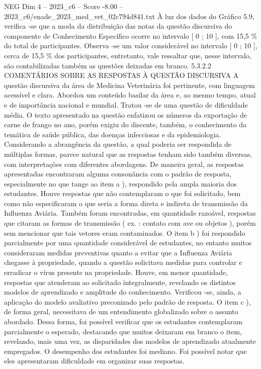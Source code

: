 \begin{textsample}{NEG Dim 4 – 2023\_c6 – Score -8.00 – 2023\_c6/enade\_2023\_med\_vet\_02c794d841.txt}
À luz dos dados do Gráfico 5.9, verifica -se que a moda da distribuição das notas da questão discursiva do componente de Conhecimento Específico ocorre no intervalo [ 0 ; 10 ], com 15,5 \% do total de participantes.
Observa -se um valor considerável no intervalo [ 0 ; 10 ], cerca de 15,5 \% dos participantes, entretanto, vale ressaltar que, nesse intervalo, são contabilizadas também as questões deixadas em branco. 5.3.2.2 COMENTÁRIOS SOBRE AS RESPOSTAS À QUESTÃO DISCURSIVA A questão discursiva da área de Medicina Veterinária foi pertinente, com linguagem acessível e clara.
Abordou um conteúdo basilar da área e, ao mesmo tempo, atual e de importância nacional e mundial.
Tratou -se de uma questão de dificuldade média.
O texto apresentado na questão enfatizou os números da exportação de carne de frango no ano, porém exigiu do discente, também, o conhecimento da temática de saúde pública, das doenças infecciosas e da epidemiologia.
Considerando a abrangência da questão, a qual poderia ser respondida de múltiplas formas, parece natural que as respostas tenham sido também diversas, com interpretações com diferentes abordagens.
De maneira geral, as respostas apresentadas encontraram alguma consonância com o padrão de resposta, especialmente no que tange ao item a ), respondido pela ampla maioria dos estudantes.
Houve respostas que não contemplaram o que foi solicitado, bem como não especificaram o que seria a forma direta e indireta de transmissão da Influenza Aviária.
Também foram encontradas, em quantidade razoável, respostas que citaram as formas de transmissão ( ex. : contato com ave ou objetos ), porém sem mencionar que tais vetores eram contaminados.
O item b ) foi respondido parcialmente por uma quantidade considerável de estudantes, no entanto muitos consideraram medidas preventivas quanto a evitar que a Influenza Aviária chegasse à propriedade, quando a questão solicitava medidas para controlar e erradicar o vírus presente na propriedade.
Houve, em menor quantidade, respostas que atenderam ao solicitado integralmente, revelando os distintos modelos de aprendizado e amplitude do conhecimento.
Verificou -se, ainda, a aplicação do modelo avaliativo preconizado pelo padrão de resposta.
O item c ), de forma geral, necessitava de um entendimento globalizado sobre o assunto abordado.
Dessa forma, foi possível verificar que os estudantes contemplaram parcialmente o esperado, destacando que muitos deixaram em branco o item, revelando, mais uma vez, as disparidades dos modelos de aprendizado atualmente empregados.
O desempenho dos estudantes foi mediano.
Foi possível notar que eles apresentaram dificuldade em organizar suas respostas.

\end{textsample}

